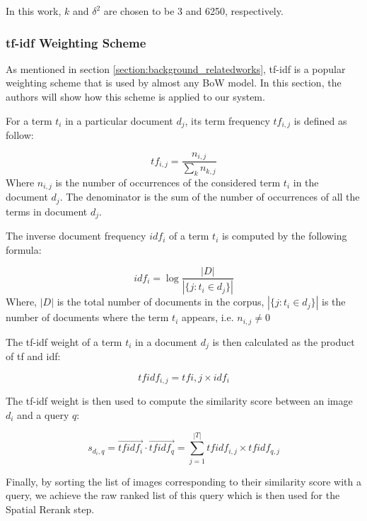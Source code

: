 In this work, $k$ and $\delta^2$ are chosen to be 3 and 6250, respectively.

\subsubsection{tf-idf Weighting Scheme} \label{section:tfidf_weighting}

As mentioned in section \ref{section:background_relatedworks}, tf-idf is a popular weighting scheme that is used by almost any BoW model. In this section, the authors will show how this scheme is applied to our system.

For a term $t_{i}$ in a particular document $d_{j}$, its term frequency $tf_{i, j}$ is defined as follow:

\begin{equation} 
        tf_{i, j} = \frac{n_{i, j}}{\sum\limits_{k} n_{k, j}}
\end{equation}
Where $n_{i, j}$ is the number of occurrences of the considered term $t_{i}$ in the document $d_{j}$. The denominator is the sum of the number of occurrences of all the terms in document $d_{j}$.

The inverse document frequency $idf_{i}$ of a term $t_{i}$ is computed by the following formula:

\begin{equation}
        idf_{i} = \log{\frac{\left|D\right|}{\left|\{j: t_{i} \in d_{j}\}\right|}}
\end{equation}
Where, $\left|D\right|$ is the total number of documents in the corpus, $\left|\{j: t_{i} \in d_{j}\}\right|$ is the number of documents where the term $t_{i}$ appears, i.e. $n_{i, j} \ne 0$

The tf-idf weight of a term $t_{i}$ in a document $d_{j}$ is then calculated as the product of tf and idf:

\begin{equation}
{tfidf}_{i, j} = tf{i, j} \times idf_{i}
\end{equation}

The tf-idf weight is then used to compute the similarity score between an image $d_{i}$ and a query $q$:

\begin{equation}
s_{d_{i}, q} = \vec{{tfidf}_{i}} \cdot \vec{{tfidf}_{q}} = \sum\limits_{j = 1}^{\left|T\right|} {tfidf}_{i, j} \times {tfidf}_{q, j}
\end{equation} 

Finally, by sorting the list of images corresponding to their similarity score with a query, we achieve the raw ranked list of this query which is then used for the Spatial Rerank step.